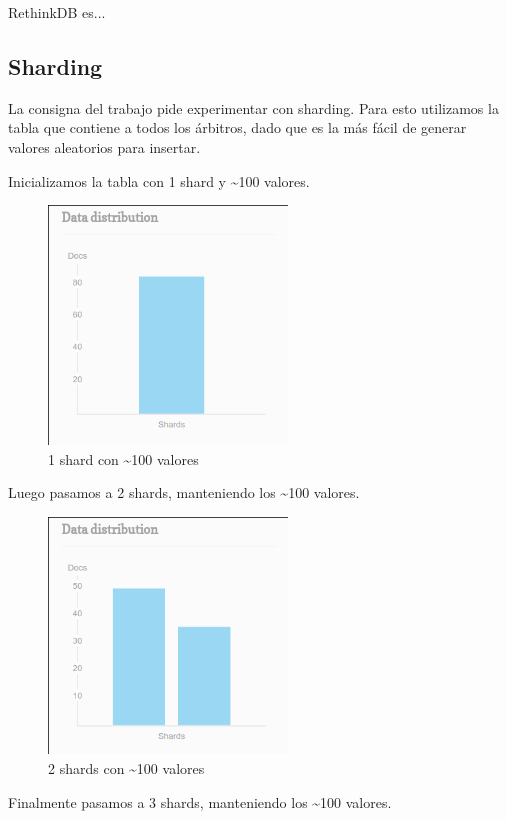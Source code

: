 
RethinkDB es...


\subsection{Sharding}

La consigna del trabajo pide experimentar con sharding. Para esto utilizamos la tabla que contiene a todos los árbitros, dado que es la más fácil de generar valores aleatorios para insertar.

Inicializamos la tabla con 1 shard y \textasciitilde 100 valores.

\begin{figure}[H]
 \centering
 \includegraphics[width=2.5in]{sharding/img/1shard.png}
 \caption{1 shard con \textasciitilde 100 valores}
 \label{fig:1shard}
\end{figure}

Luego pasamos a 2 shards, manteniendo los \textasciitilde 100 valores.

\begin{figure}[H]
 \centering
 \includegraphics[width=2.5in]{sharding/img/2shard.png}
 \caption{2 shards con \textasciitilde 100 valores}
 \label{fig:2shard}
\end{figure}

Finalmente pasamos a 3 shards, manteniendo los \textasciitilde 100 valores.

